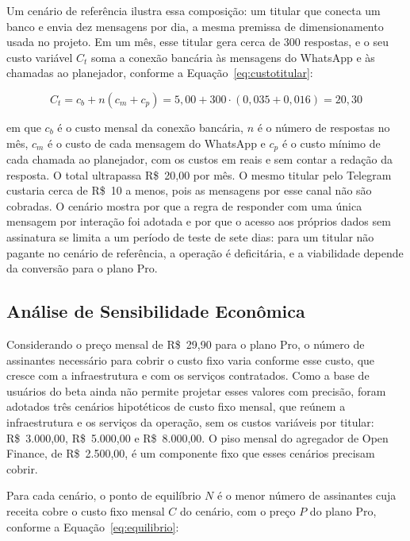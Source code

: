 Um cenário de referência ilustra essa composição: um titular que conecta um banco e envia dez mensagens por dia, a mesma premissa de dimensionamento usada no projeto. Em um mês, esse titular gera cerca de 300 respostas, e o seu custo variável $C_t$ soma a conexão bancária às mensagens do WhatsApp e às chamadas ao planejador, conforme a Equação~\ref{eq:custotitular}:

\begin{equation}
C_t = c_b + n \left(c_m + c_p\right) = 5{,}00 + 300 \cdot \left(0{,}035 + 0{,}016\right) = 20{,}30
\label{eq:custotitular}
\end{equation}

\noindent em que $c_b$ é o custo mensal da conexão bancária, $n$ é o número de respostas no mês, $c_m$ é o custo de cada mensagem do WhatsApp e $c_p$ é o custo mínimo de cada chamada ao planejador, com os custos em reais e sem contar a redação da resposta. O total ultrapassa R\$~20,00 por mês. O mesmo titular pelo Telegram custaria cerca de R\$~10 a menos, pois as mensagens por esse canal não são cobradas. O cenário mostra por que a regra de responder com uma única mensagem por interação foi adotada e por que o acesso aos próprios dados sem assinatura se limita a um período de teste de sete dias: para um titular não pagante no cenário de referência, a operação é deficitária, e a viabilidade depende da conversão para o plano Pro.

\subsection{Análise de Sensibilidade Econômica}

Considerando o preço mensal de R\$~29,90 para o plano Pro, o número de assinantes necessário para cobrir o custo fixo varia conforme esse custo, que cresce com a infraestrutura e com os serviços contratados. Como a base de usuários do beta ainda não permite projetar esses valores com precisão, foram adotados três cenários hipotéticos de custo fixo mensal, que reúnem a infraestrutura e os serviços da operação, sem os custos variáveis por titular: R\$~3.000,00, R\$~5.000,00 e R\$~8.000,00. O piso mensal do agregador de Open Finance, de R\$~2.500,00, é um componente fixo que esses cenários precisam cobrir.

Para cada cenário, o ponto de equilíbrio $N$ é o menor número de assinantes cuja receita cobre o custo fixo mensal $C$ do cenário, com o preço $P$ do plano Pro, conforme a Equação~\ref{eq:equilibrio}:

